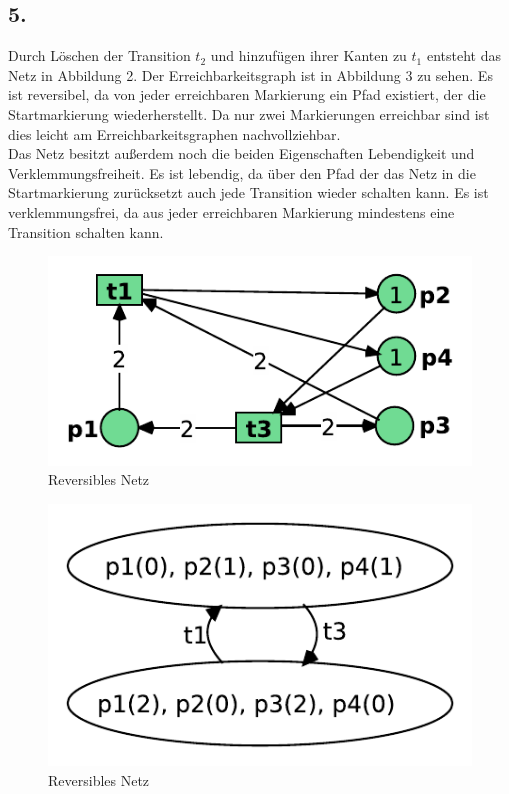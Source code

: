 \documentclass[12pt, paper=a4]{article}
\begin{document}
\subsection*{5.}
Durch Löschen der Transition $t_2$ und hinzufügen ihrer Kanten zu $t_1$ entsteht das Netz in Abbildung 2. Der Erreichbarkeitsgraph ist in Abbildung 3 zu sehen. Es ist reversibel, da von jeder erreichbaren Markierung ein Pfad existiert, der die Startmarkierung wiederherstellt. Da nur zwei Markierungen erreichbar sind ist dies leicht am Erreichbarkeitsgraphen nachvollziehbar.\\
Das Netz besitzt außerdem noch die beiden Eigenschaften Lebendigkeit und Verklemmungsfreiheit. Es ist lebendig, da über den Pfad der das Netz in die Startmarkierung zurücksetzt auch jede Transition wieder schalten kann. Es ist verklemmungsfrei, da aus jeder erreichbaren Markierung mindestens eine Transition schalten kann.\\

\begin{figure}[h!]
\centering
\includegraphics[scale=0.9]{reversible.pdf}
\caption{Reversibles Netz}
\end{figure}

\begin{figure}[h!]
\centering
\includegraphics[scale=0.7]{Erreichbarkeitsgraph7-3-5.pdf}
\caption{Reversibles Netz}
\end{figure}
\end{document}
